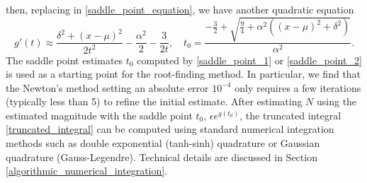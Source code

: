 \documentclass[10pt,a4paper,oneside]{article}
\numberwithin{equation}{section}
\begin{document}
then, replacing in \eqref{saddle_point_equation}, we have another quadratic equation
\begin{equation}\label{saddle_point_2}
g'(t) \approx \frac{\delta^2 + (x-\mu)^2}{2t^2} -\frac{\alpha^2}{2} -\frac{3}{2t}, \quad t_0 = \frac{-\frac{3}{2} + \sqrt{\frac{9}{4} + \alpha^2 \left((x-\mu)^2 + \delta^2\right)}}{\alpha^2}.
\end{equation}
The saddle point estimates $t_0$ computed by \eqref{saddle_point_1} or \eqref{saddle_point_2} is used as a starting point for the root-finding method. In particular, we find that the Newton's method setting an absolute error $10^{-4}$ only requires a few iterations (typically less than 5) to refine the initial estimate. After estimating $N$ using the estimated magnitude with the saddle point $t_0$, $\epsilon e^{g(t_0)}$, the truncated integral \eqref{truncated_integral} can be computed using standard numerical integration methods such as double exponential (tanh-sinh) quadrature or Gaussian quadrature (Gauss-Legendre). Technical details are discussed in Section \ref{algorithmic_numerical_integration}.
\end{document}
